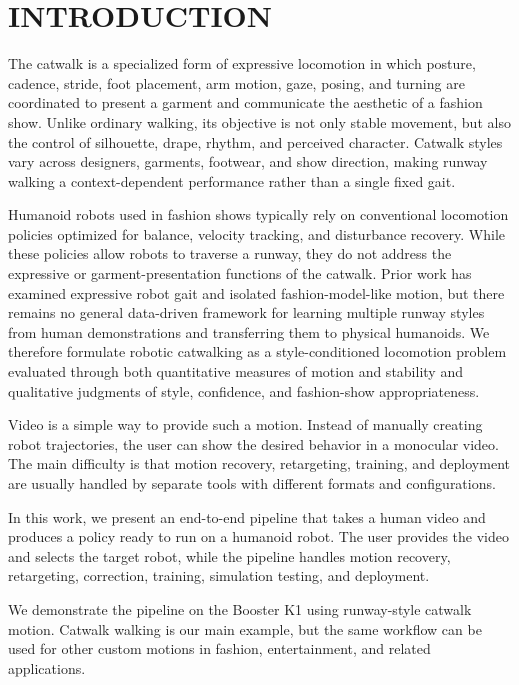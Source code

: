\section{INTRODUCTION}

The catwalk is a specialized form of expressive locomotion in which posture, cadence, stride, foot placement, arm motion, gaze, posing, and turning are coordinated to present a garment and communicate the aesthetic of a fashion show. Unlike ordinary walking, its objective is not only stable movement, but also the control of silhouette, drape, rhythm, and perceived character. Catwalk styles vary across designers, garments, footwear, and show direction, making runway walking a context-dependent performance rather than a single fixed gait.

Humanoid robots used in fashion shows typically rely on conventional locomotion policies optimized for balance, velocity tracking, and disturbance recovery. While these policies allow robots to traverse a runway, they do not address the expressive or garment-presentation functions of the catwalk. Prior work has examined expressive robot gait and isolated fashion-model-like motion, but there remains no general data-driven framework for learning multiple runway styles from human demonstrations and transferring them to physical humanoids. We therefore formulate robotic catwalking as a style-conditioned locomotion problem evaluated through both quantitative measures of motion and stability and qualitative judgments of style, confidence, and fashion-show appropriateness.

Video is a simple way to provide such a motion. Instead of manually creating robot trajectories, the user can show the desired behavior in a monocular video. The main difficulty is that motion recovery, retargeting, training, and deployment are usually handled by separate tools with different formats and configurations.

In this work, we present an end-to-end pipeline that takes a human video and produces a policy ready to run on a humanoid robot. The user provides the video and selects the target robot, while the pipeline handles motion recovery, retargeting, correction, training, simulation testing, and deployment.

We demonstrate the pipeline on the Booster K1 using runway-style catwalk motion. Catwalk walking is our main example, but the same workflow can be used for other custom motions in fashion, entertainment, and related applications.
